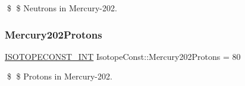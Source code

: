 \$ \$ Neutrons in Mercury-\/202. \mbox{\label{group___isotope_const-_mercury-_hg202_ga045c69f301ffbcd5d6061fd72c666ba5}} 
\subsubsection{\texorpdfstring{Mercury202\+Protons}{Mercury202Protons}}
{\footnotesize\ttfamily \mbox{\hyperlink{group___isotope_const-_macros_ga5f18360b3e99483a35c32d789e62621c}{I\+S\+O\+T\+O\+P\+E\+C\+O\+N\+S\+T\+\_\+\+I\+NT}} Isotope\+Const\+::\+Mercury202\+Protons = 80}

\$ \$ Protons in Mercury-\/202. 